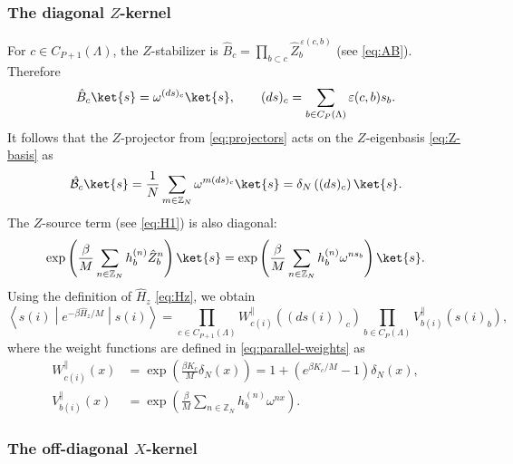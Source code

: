 \documentclass[dvipsnames,a4paper]{article}
\numberwithin{equation}{section}
\theoremstyle{definition}
\theoremstyle{remark}
\newcommand{\matrixel}[3]{\left\langle #1 \middle| #2 \middle| #3 \right\rangle}
\begin{document}
\subsubsection{The diagonal \(Z\)-kernel}

For \(c\in C_{P+1}(\Lambda)\), the $Z$-stabilizer is $\hat B_c=\prod_{b\subset c}\hat Z_b^{\,\varepsilon(c,b)}$ (see \eqref{eq:AB}).
Therefore
\begin{equation}
	\hat B_c\ket{s}
	=
	\omega^{(ds)_c}\ket{s},
	\qquad
	(ds)_c
	=
	\sum_{b\in C_P(\Lambda)}\varepsilon(c,b)s_b.
	\label{eq:Bc-eigenvalue}
\end{equation}
It follows that the $Z$-projector from \eqref{eq:projectors} acts on the $Z$-eigenbasis \eqref{eq:Z-basis} as
\begin{equation}
	\hat{\mathcal B}_c\ket{s}
	=
	\frac1N\sum_{m\in\mathbb Z_N}\omega^{m(ds)_c}\ket{s}
	=
	\delta_N\left((ds)_c\right)\ket{s}.
	\label{eq:Bproj-eigenvalue}
\end{equation}
The \(Z\)-source term (see \eqref{eq:H1}) is also diagonal:
\begin{equation}
	\exp\left(
	\frac{\beta}{M}\sum_{n\in\mathbb Z_N}h_b^{(n)}\hat Z_b^n
	\right)\ket{s}
	=
	\exp\left(
	\frac{\beta}{M}\sum_{n\in\mathbb Z_N}h_b^{(n)}\omega^{n s_b}
	\right)\ket{s}.
	\label{eq:h-source-diagonal}
\end{equation}
Using the definition of \(\hat H_z\) \eqref{eq:Hz}, we obtain
\begin{equation}
	\matrixel{s(i)}{e^{-\beta\hat H_z/M}}{s(i)}
	=
	\prod_{c\in C_{P+1}(\Lambda)}
	W_{c(i)}^{\parallel}\left((ds(i))_c\right)
	\prod_{b\in C_P(\Lambda)}
	V_{b(i)}^{\parallel}\left(s(i)_b\right),
	\label{eq:Hz-kernel}
\end{equation}
where the weight functions are defined in \eqref{eq:parallel-weights} as
\begin{subequations}
	\begin{align}
		W_{c(i)}^{\parallel}(x)
		&=
		\exp\left(\frac{\beta K_c}{M}\delta_N(x)\right)
		=
		1+\left(e^{\beta K_c/M}-1\right)\delta_N(x),
		\\
		V_{b(i)}^{\parallel}(x)
		&=
		\exp\left(
		\frac{\beta}{M}\sum_{n\in\mathbb Z_N}h_b^{(n)}\omega^{nx}
		\right).
	\end{align}
\end{subequations}

\subsubsection{The off-diagonal \(X\)-kernel}
\end{document}
